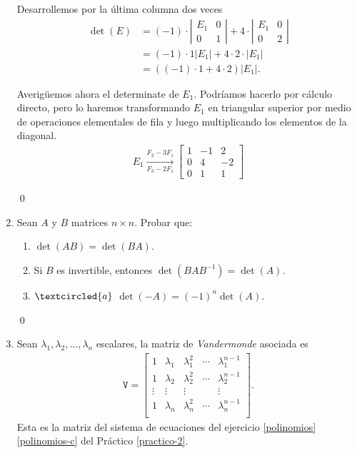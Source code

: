 \begin{enumerate}[topsep=6pt,itemsep=.4cm]
    Desarrollemos por la última columna dos veces
    \begin{align*}
        \det(E) &= (-1) \cdot \left| \begin{matrix}  E_1&0\\0&1 \end{matrix} \right| + 4 \cdot\left| \begin{matrix}  E_1&0\\0&2 \end{matrix} \right| \\
        &= (-1) \cdot 1 \left|   E_1 \right| + 4 \cdot 2\cdot\left|   E_1 \right| \\
        &= ((-1) \cdot 1 + 4 \cdot 2) \left|   E_1 \right|.
    \end{align*}

    Averigüemos ahora el determinate de $E_1$. Podríamos hacerlo por cálculo directo, pero  lo haremos transformando   $E_1$ en triangular superior por medio de operaciones elementales de fila y luego multiplicando los elementos de la diagonal. 
    \begin{align*}
        E_1 {\underset{F_3 -2F_1}{\stackrel{F_2-3F_1}{\longrightarrow}}} \begin{bmatrix}1&-1&2\\ 0&4&-2\\ 0&1&1  \end{bmatrix}
    \end{align*}

    \qed
    
    \item Sean $A$ y  $B$ matrices $n \times n$. Probar que:
    \begin{enumerate}
        \item $\det(AB) = \det (BA)$.
        \item Si $B$ es invertible, entonces $\det(B A B^{-1}) = \det (A)$.
        \item\label{-A} $\textcircled{a}$ $\det(-A) = (-1)^n\det (A)$.
    \end{enumerate}


    \rta

    \qed
    
    \item\label{vandermonde} Sean $\lambda_1, \lambda_2, \dots, \lambda_n$ escalares, la matriz de \emph{Vandermonde} asociada es
    \begin{align*}
    \mathtt V = \begin{bmatrix}
    1 & \lambda_1 & \lambda_1^2 & \cdots & \lambda_1^{n-1}\\
    1 & \lambda_2 & \lambda_2^2 & \cdots & \lambda_2^{n-1}\\
    \vdots &\vdots &\vdots & &\vdots\\
    1 & \lambda_n & \lambda_n^2 & \cdots & \lambda_n^{n-1}\\
    \end{bmatrix}.
    \end{align*}
    Esta es la matriz del sistema de ecuaciones del ejercicio \ref{polinomios}\,\ref{polinomios-c} del Práctico \ref{practico-2}.
    

\end{enumerate}
